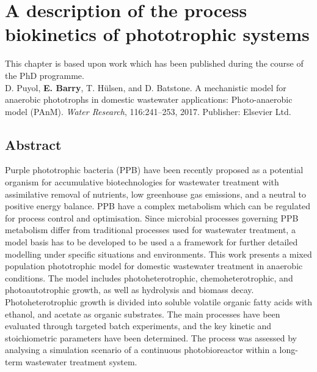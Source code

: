 \chapter[A description of the process biokinetics of phototrophic systems]{A description of the process biokinetics of phototrophic systems}
\label{Chap:chap2}	%
\pagestyle{headings}

This chapter is based upon work which has been published during the course of the PhD programme.\\

D. Puyol, \textbf{E. Barry}, T. H\"{u}lsen, and D. Batstone. A mechanistic model for anaerobic phototrophs
in domestic wastewater applications: Photo-anaerobic model (PAnM).
\textit{Water Research}, 116:241–253, 2017. Publisher: Elsevier Ltd.

\section*{Abstract}
Purple phototrophic bacteria (PPB) have been recently proposed as a potential organism for accumulative biotechnologies for wastewater treatment with assimilative removal of nutrients, low greenhouse gas emissions, and a neutral to positive energy balance. PPB have a complex metabolism which can be regulated for process control and optimisation. Since microbial processes governing PPB metabolism differ from traditional processes used for wastewater treatment, a model basis has to be developed to be used a a framework for further detailed modelling under specific situations and environments. This work presents a mixed population phototrophic model for domestic wastewater treatment in anaerobic conditions. The model includes photoheterotrophic, chemoheterotrophic, and photoautotrophic growth, as well as hydrolysis and biomass decay. Photoheterotrophic growth is divided into soluble volatile organic fatty acids with ethanol, and acetate as organic substrates. The main processes have been evaluated through targeted batch experiments, and the key kinetic and stoichiometric parameters have been determined. The process was assessed by analysing a simulation scenario of a continuous photobioreactor within a long-term wastewater treatment system. 

